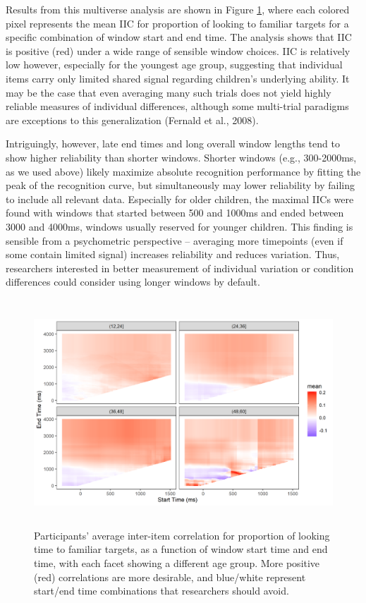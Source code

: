 \documentclass[10pt, letterpaper]{article}
\begin{document}
Results from this multiverse analysis are shown in Figure
\ref{fig:time_window}, where each colored pixel represents the mean IIC
for proportion of looking to familiar targets for a specific combination
of window start and end time. The analysis shows that IIC is positive
(red) under a wide range of sensible window choices. IIC is relatively
low however, especially for the youngest age group, suggesting that
individual items carry only limited shared signal regarding children's
underlying ability. It may be the case that even averaging many such
trials does not yield highly reliable measures of individual
differences, although some multi-trial paradigms are exceptions to this
generalization (Fernald et al., 2008).

Intriguingly, however, late end times and long overall window lengths
tend to show higher reliability than shorter windows. Shorter windows
(e.g., 300-2000ms, as we used above) likely maximize absolute
recognition performance by fitting the peak of the recognition curve,
but simultaneously may lower reliability by failing to include all
relevant data. Especially for older children, the maximal IICs were
found with windows that started between 500 and 1000ms and ended between
3000 and 4000ms, windows usually reserved for younger children. This
finding is sensible from a psychometric perspective -- averaging more
timepoints (even if some contain limited signal) increases reliability
and reduces variation. Thus, researchers interested in better
measurement of individual variation or condition differences could
consider using longer windows by default.

\begin{figure} 
\includegraphics[width=13.6cm,height=8.5cm]{../figures/interitem_cors_window_analysis.png}
\caption{Participants' average inter-item correlation for proportion of looking time to familiar targets, as a function of window start time and end time, with each facet showing a different age group. More positive (red) correlations are more desirable, and blue/white represent start/end time combinations that researchers should avoid.}
\label{fig:time_window}
\end{figure}
\end{document}
